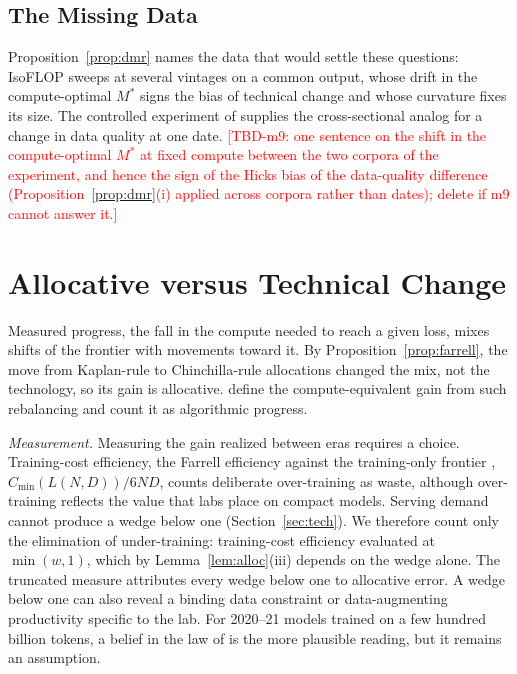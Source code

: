 \documentclass[AER,finalmode]{AEA}
\theoremstyle{definition}
\theoremstyle{remark}
\begin{document}
\subsection{The Missing Data}

Proposition~\ref{prop:dmr} names the data that would settle these questions: IsoFLOP sweeps at several vintages on a
common output, whose drift in the compute-optimal $M^*$ signs the bias of technical change and whose curvature fixes
its size. The controlled experiment of \citet{okar2026what} supplies the cross-sectional analog for a change in data
quality at one date.
\textcolor{red}{[TBD-m9: one sentence on the shift in the compute-optimal $M^*$ at fixed compute between the two
corpora of the experiment, and hence the sign of the Hicks bias of the data-quality difference
(Proposition~\ref{prop:dmr}(i) applied across corpora rather than dates); delete if m9 cannot answer it.]}

\section{Allocative versus Technical Change}\label{sec:allocative}

Measured progress, the fall in the compute needed to reach a given loss, mixes shifts of the frontier with movements
toward it. By Proposition~\ref{prop:farrell}, the move from Kaplan-rule to Chinchilla-rule allocations changed the mix,
not the technology, so its gain is allocative. \citet{gundlach2025origin} define the compute-equivalent gain from such
rebalancing and count it as algorithmic progress.

\textit{Measurement.} Measuring the gain realized between eras requires a choice. Training-cost efficiency, the
Farrell efficiency against the training-only frontier \citep{farrell1957measurement}, $C_{\min}(L(N,D))/6ND$, counts
deliberate over-training as waste, although over-training reflects the value that labs place on compact models.
Serving demand cannot produce a wedge below one (Section~\ref{sec:tech}). We therefore count only the elimination of
under-training: training-cost efficiency evaluated at $\min(w,1)$, which by Lemma~\ref{lem:alloc}(iii) depends on the
wedge alone. The truncated measure attributes every wedge below one to allocative error. A wedge below one can also
reveal a binding data constraint or data-augmenting productivity specific to the lab. For 2020--21 models trained on a
few hundred billion tokens, a belief in the law of \citet{kaplan2020scaling} is the more plausible reading, but it
remains an assumption.
\end{document}
